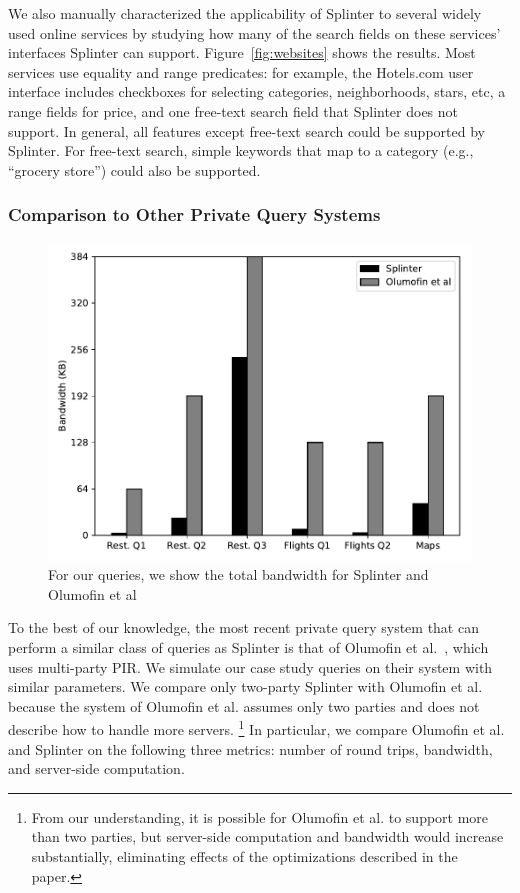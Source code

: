 We also manually characterized the applicability of Splinter to several widely used online services by studying how many of the search fields on these services' interfaces Splinter can support.
Figure~\ref{fig:websites} shows the results. 
Most services use equality and range predicates: for example, the
Hotels.com user interface includes checkboxes for selecting categories, neighborhoods, stars, etc, a range fields for price, and one free-text search field that Splinter does not support.
In general, all features except free-text search could be supported by Splinter.
For free-text search, simple keywords that map to a category (e.g., ``grocery store'') could also be supported.

\subsubsection{Comparison to Other Private Query Systems}
\label{sec:comparison}

\begin{figure}
	\centering
	\includegraphics[width=\textwidth]{splinter-figs/bandwidth_comparison.pdf}
	\caption{For our queries, we show the total bandwidth for Splinter and Olumofin et al~\cite{goldberg}}
	\label{fig:bandwidth_comp}
\end{figure}

To the best of our knowledge, the most recent
private query system that can perform a similar class of queries
as Splinter is that of Olumofin et al.~\cite{goldberg},
which uses multi-party PIR. We simulate our case study queries 
on their system with similar parameters.
We compare only two-party Splinter with Olumofin et al.
because the system of Olumofin et al. assumes only two parties 
and does not describe how to handle more servers.
\footnote{From our understanding, it is possible for Olumofin et al. to support
	more than two parties, but server-side computation and bandwidth would increase
	substantially, eliminating effects of the optimizations described in the 
	paper.}
In particular, we compare Olumofin et al. and Splinter on
the following three metrics: number of  
round trips, bandwidth, and server-side computation. 

